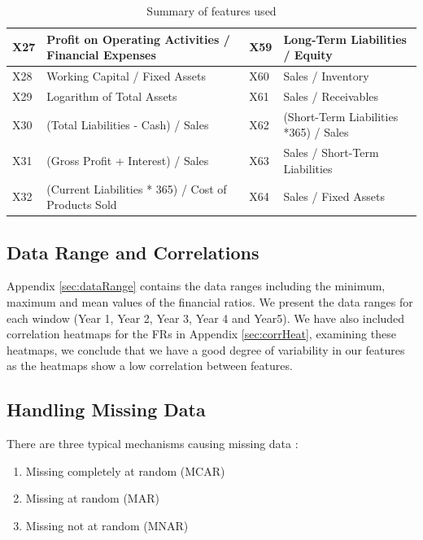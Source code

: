 \begin{table}
\begin{center}
\begin{tabular}{|p{0.65cm}|p{6.5cm}|p{0.65cm}|p{6.5cm}|}
    X27 & Profit on Operating Activities / Financial Expenses & X59 & Long-Term Liabilities / Equity \\ \hline

    X28 & Working Capital / Fixed Assets & X60 & Sales / Inventory \\ \hline

    X29 & Logarithm of Total Assets & X61 & Sales / Receivables \\ \hline

    X30 & (Total Liabilities - Cash) / Sales & X62 & (Short-Term Liabilities *365) / Sales \\ \hline

    X31 & (Gross Profit + Interest) / Sales & X63 & Sales / Short-Term Liabilities \\ \hline
    
    X32 & (Current Liabilities * 365) / Cost of Products Sold & X64 & Sales / Fixed Assets \\ \hline
\end{tabular}
\end{center}
    \caption{Summary of features used}
\label{table:FRstatsDefault}
\end{table}


\subsection{Data Range and Correlations}

Appendix \autoref{sec:dataRange} contains the data ranges including the minimum, maximum and mean values of the financial ratios. We present the data ranges for each window (Year 1, Year 2, Year 3, Year 4 and Year5).
We have also included correlation heatmaps for the FRs in Appendix \autoref{sec:corrHeat}, examining these heatmaps, we conclude that we have a good degree of variability in our features as the heatmaps show a low correlation between features.

\subsection{Handling Missing Data}

There are three typical mechanisms causing missing data \cite{little2012prevention,sterne2009multiple,dziura2013strategies}: 
\begin{enumerate}
    \item Missing completely at random (MCAR)
    \item Missing at random (MAR)
    \item Missing not at random (MNAR)
\end{enumerate}

